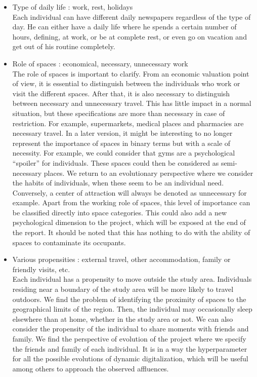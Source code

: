 \begin{itemize}
\item Type of daily life : work, rest, holidays\\
Each individual can have different daily newspapers regardless of the type of day. He can either have a daily life where he spends a certain number of hours, defining, at work, or be at complete rest, or even go on vacation and get out of his routine completely.\\

\item Role of spaces : economical, necessary, unnecessary work\\
The role of spaces is important to clarify. From an economic valuation point of view, it is essential to distinguish between the individuals who work or visit the different spaces. After that, it is also necessary to distinguish between necessary and unnecessary travel. This has little impact in a normal situation, but these specifications are more than necessary in case of restriction. For example, supermarkets, medical places and pharmacies are necessary travel. In a later version, it might be interesting to no longer represent the importance of spaces in binary terms but with a scale of necessity. For example, we could consider that gyms are a psychological ``spoiler'' for individuals. These spaces could then be considered as semi-necessary places. We return to an evolutionary perspective where we consider the habits of individuals, when these seem to be an individual need. Conversely, a center of attraction will always be denoted as unnecessary for example. Apart from the working role of spaces, this level of importance can be classified directly into space categories. This could also add a new psychological dimension to the project, which will be exposed at the end of the report. It should be noted that this has nothing to do with the ability of spaces to contaminate its occupants.\\

\item Various propensities : external travel, other accommodation, family or friendly visits, etc.\\
Each individual has a propensity to move outside the study area. Individuals residing near a boundary of the study area will be more likely to travel outdoors. We find the problem of identifying the proximity of spaces to the geographical limits of the region. Then, the individual may occasionally sleep elsewhere than at home, whether in the study area or not. We can also consider the propensity of the individual to share moments with friends and family. We find the perspective of evolution of the project where we specify the friends and family of each individual. It is in a way the hyperparameter for all the possible evolutions of dynamic digitalization, which will be useful among others to approach the observed affluences.\\


\end{itemize}

